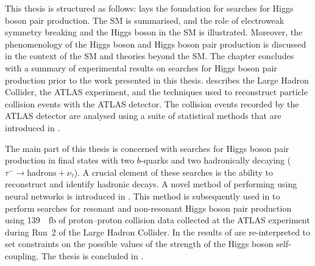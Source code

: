 This thesis is structured as follows:  lays the
foundation for searches for Higgs boson pair production. The SM is summarised,
and the role of electroweak symmetry breaking and the Higgs boson in the SM is
illustrated. Moreover, the phenomenology of the Higgs boson and Higgs boson pair
production is discussed in the context of the SM and theories beyond the SM. The
chapter concludes with a summary of experimental results on searches for Higgs
boson pair production prior to the work presented in this thesis.
 describes the Large Hadron Collider, the ATLAS
experiment, and the techniques used to reconstruct particle collision events
with the ATLAS detector. The collision events recorded by the ATLAS detector are
analysed using a suite of statistical methods that are introduced in
.

The main part of this thesis is concerned with searches for Higgs boson pair
production in final states with two $b$-quarks and two hadronically decaying
\tauleptons ($\tau^{-} \to \text{hadrons} + \nu_\tau$). A crucial element of
these searches is the ability to reconstruct and identify hadronic \taulepton
decays. A novel method of performing \tauid using neural networks is
introduced in . This method is subsequently used in
 to perform searches for resonant and non-resonant Higgs boson
pair production using \SI{139}{\per\femto\barn} of proton--proton collision data
collected at the ATLAS experiment during Run~2 of the Large Hadron Collider. In
 the results of  are
re-interpreted to set constraints on the possible values of the strength of the
Higgs boson self-coupling. The thesis is concluded in .








